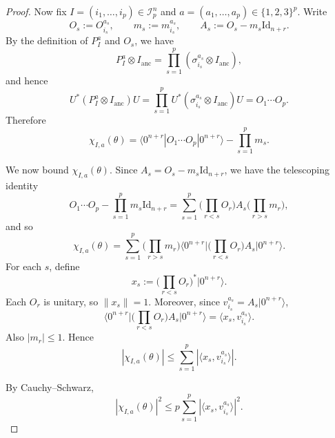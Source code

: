 \documentclass[12pt]{article}
\newcommand{\mcI}{\mathcal{I}}
\begin{document}
\begin{proof}
Now fix \(I=(i_1,\dots,i_p)\in\mcI_p^n\) and
\(a=(a_1,\dots,a_p)\in\{1,2,3\}^p\). Write
\[
    O_s:=O_{i_s}^{a_s},
    \qquad
    m_s:=m_{i_s}^{a_s},
    \qquad
    A_s:=O_s-m_s \mathrm{Id}_{n+r}.
\]
By the definition of \(P_I^a\) and \(O_s\), we have
\[
P_I^a\otimes I_{\mathrm{anc}}
=
\prod_{s=1}^p(\sigma_{i_s}^{a_s}\otimes I_{\mathrm{anc}}),
\]
and hence
\[
U^*(P_I^a\otimes I_{\mathrm{anc}})U
=
\prod_{s=1}^p
U^*(\sigma_{i_s}^{a_s}\otimes I_{\mathrm{anc}})U
=
O_1\cdots O_p .
\]
Therefore
\[
\chi_{I,a}(\theta)
=
\langle0^{n+r}|O_1\cdots O_p|0^{n+r}\rangle
-
\prod_{s=1}^p m_s .
\]

We now bound \(\chi_{I,a}(\theta)\). Since \(A_s=O_s-m_s \mathrm{Id}_{n+r}\), we have the
telescoping identity
\[
O_1\cdots O_p-\prod_{s=1}^p m_s \mathrm{Id}_{n+r}
=
\sum_{s=1}^p
\big(
\prod_{r<s}O_r
\big)
A_s
\big(
\prod_{r>s}m_r
\big),
\]
and so
\[
\chi_{I,a}(\theta)
=
\sum_{s=1}^p
\big(
\prod_{r>s}m_r
\big)
\big\langle
0^{n+r}
\big |
\big (\prod_{r<s}O_r \big)
A_s
\big|
0^{n+r}
\big\rangle .
\]
For each \(s\), define
\[
    x_s
    :=
    \big(\prod_{r<s}O_r\big)^*|0^{n+r}\rangle .
\]
Each \(O_r\) is unitary, so \(\|x_s\|=1\). Moreover, since
\(v_{i_s}^{a_s}=A_s|0^{n+r}\rangle\),
\[
\big\langle
0^{n+r}
\big|
\big(\prod_{r<s}O_r\big)
A_s
\big|
0^{n+r}
\big\rangle
=
\langle x_s,v_{i_s}^{a_s}\rangle .
\]
Also \(|m_r|\le1\). Hence
\[
|\chi_{I,a}(\theta)|
\le
\sum_{s=1}^p
|\langle x_s,v_{i_s}^{a_s}\rangle|.
\]

By Cauchy--Schwarz,
\[
|\chi_{I,a}(\theta)|^2
\le
p
\sum_{s=1}^p
|\langle x_s,v_{i_s}^{a_s}\rangle|^2 .
\]


\end{proof}
\end{document}
